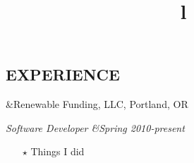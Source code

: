 \documentclass[11pt]{res} %
\begin{document}
 
 

\address{{\bf CONTACT INFORMATION} \\   Portland, OR \\   \href{mailto:laurie.kemmerer@gmail.com}{laurie.kemmerer@gmail.com}
          \\ (503) 866-4437}
\address{{\bf } \\ \url{http://github.com/lkemmerer} \\ \href{http://twitter.com/im\_a\_radish}{@im\_a\_radish}}
 
                                             
\begin{resume}
 
\section{EXPERIENCE} 
\begin{ncolumn}{2}
	&\hfill{}Renewable Funding, LLC, Portland, OR \\
\end{ncolumn}{}
\begin{ncolumn}{2}
	\title{l}\itshape Software Developer &\hfill{}Spring 2010-present \\
\end{ncolumn}
\begin{itemize} \itemsep -2pt
	\item[$\star$] Things I did
\end{itemize}


\end{resume}
\end{document}
